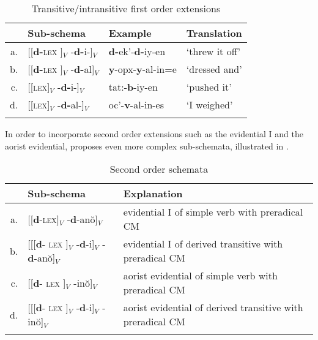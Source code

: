 \documentclass[output=paper]{langsci/langscibook}
\begin{document}
\begin{table}[h]
  \caption{Transitive/intransitive first order extensions \label{ex:HarrisFirstOrder}}
  \begin{tabular}{rlll}
    \lsptoprule
      & Sub-schema & Example & Translation\\
    \midrule
    a. & [[\textbf{d-}\textsc{lex} ]$_V$ -\textbf{d-}i-]$_V$ &
                                                      \textbf{d-}ek’-\textbf{d-}iy-en & ‘threw it off’\\
    b. & [[\textbf{d-}\textsc{lex} ]$_V$ -\textbf{d-}al]$_V$ &
                                                      \textbf{y}-opx-\textbf{y}-al-in=e & ‘dressed and’\\
    c. & [[\textsc{lex}]$_V$ -\textbf{d-}i-]$_V$ &
                                          tat:-\textbf{b}-iy-en & ‘pushed it’  \\
    d. & [[\textsc{lex}]$_V$ -\textbf{d-}al-]$_V$ &
                                           oc’-\textbf{v}-al-in-es & ‘I weighed’ \\
    \lspbottomrule
  \end{tabular}
\end{table}

In order to incorporate second order extensions such as the evidential
I and the aorist evidential, \citet{Harris09} proposes even more
complex sub-schemata, illustrated in .

\begin{table}
  \caption{Second order schemata\label{ex:HarrisSecondOrder}}
  \begin{tabularx}{\textwidth}{rlQ}
    \lsptoprule
    &  Sub-schema
    & Explanation\\
    \midrule
    a. & [[\textbf{d}-\textsc{lex}]$_V$ -\textbf{d}-anŏ]$_V$  & evidential I of simple verb with preradical CM\\
    b. & [[[\textbf{d}- \textsc{lex} ]$_V$  -\textbf{d}-i]$_V$  -\textbf{d}-anŏ]$_V$  & evidential I of derived transitive with preradical CM\\
    c. & [[\textbf{d}- \textsc{lex} ]$_V$ -inŏ]$_V$  & aorist evidential of simple verb with preradical CM\\
    d. & [[[\textbf{d}- \textsc{lex} ]$_V$  -\textbf{d}-i]$_V$ -inŏ]$_V$ & aorist evidential of derived transitive with preradical CM\\
    \lspbottomrule
  \end{tabularx}
\end{table}
\end{document}
